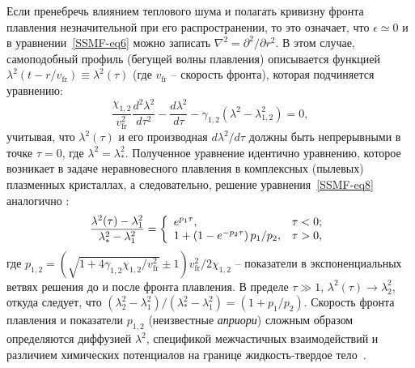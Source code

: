 Если пренебречь влиянием теплового шума и полагать кривизну фронта плавления незначительной при его распространении, то это означает, что $ \epsilon \simeq 0 $ и в уравнении~\eqref{SSMF-eq6} можно записать $ \nabla ^ 2 = \partial ^ 2 / \partial r ^ 2 $.
В этом случае, самоподобный профиль (бегущей волны плавления) описывается функцией $\lambda^2(t-r/v_\mathrm{fr})\equiv \lambda^2(\tau)$ (где $v_\mathrm{fr}$ -- скорость фронта), которая подчиняется уравнению:
\begin{equation}
\label{SSMF-eq8}
\frac{\chi_{1,2}}{v_{\mathrm{fr}}^2} \frac{d^2 \lambda^2}{d\tau^2} -\frac{d \lambda^2}{d \tau} -\gamma_{1,2}(\lambda^2-\lambda_{1,2}^2) =0,
\end{equation}
учитывая, что $\lambda^2(\tau) $ и его производная $ d\lambda^2/ d \tau $ должны быть непрерывными в точке $ \tau = 0 $, где $\lambda^2=\lambda_\ast^2$.
Полученное уравнение идентично уравнению, которое возникает в задаче неравновесного плавления в комплексных (пылевых) плазменных кристаллах, а следовательно, решение уравнения~\eqref{SSMF-eq8} аналогично \cite{10.1103/physreve.96.043201, 10.1103/physreve.100.023203}:
\begin{equation}
\label{SSMF-eq9}
\frac{\lambda^2(\tau)-\lambda^2_1}{\lambda^2_\ast-\lambda^2_1}=
\left\{
  \begin{array}{ll}
    e^{p_1 \tau}, & \tau < 0;\\
   1+\left(1-e^{-p_2\tau}\right)p_1/p_2 , & \tau > 0,\\
  \end{array}
\right. \\
\end{equation}
где $ p_{1,2} = \left(\sqrt {1 + 4 \gamma_{1,2} \chi_{1,2} / v_\mathrm{fr} ^ 2} \pm 1 \right) v_\mathrm{fr} ^ 2/2 \chi_{1,2} $ -- показатели в экспоненциальных ветвях решения до и после фронта плавления.
В пределе $\tau \gg 1$, $\lambda^2(\tau) \rightarrow \lambda_2^2$, откуда следует, что
$\left(\lambda_2^2-\lambda^2_1\right)/\left(\lambda^2_\ast-\lambda^2_1\right) = (1+p_1/p_2)$.
Скорость фронта плавления и показатели $p_{1,2} $ (неизвестные \emph{априори}) сложным образом определяются диффузией $\lambda^2$, спецификой межчастичных взаимодействий и различием химических потенциалов на границе жидкость-твердое тело~\cite{10.1038/ncomms7942}.

